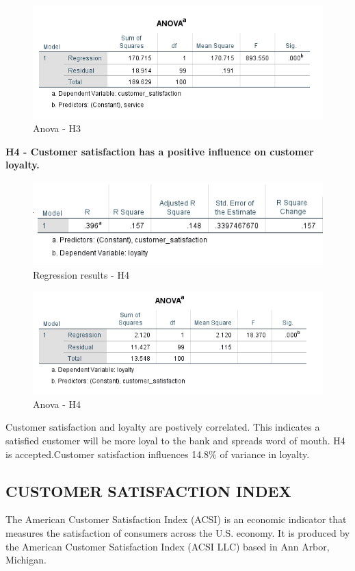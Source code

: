 \documentclass[a4paper, 12pt]{extarticle}
\begin{document}
{\begin{figure}[H]
\centering
\includegraphics[scale=1]{anova_css.png}
\caption{Anova - H3}
\end{figure}

\newpage
\par \textbf{H4 - Customer satisfaction has a positive influence on customer loyalty.}\\
\begin{figure}[H]
\centering
\includegraphics[scale=1]{customer_satisfaction_vs_loyalty.png}
\caption{Regression results - H4}
\end{figure}
\begin{figure}[H]
\centering
\includegraphics[scale=1]{anova_cs_lo.png}
\caption{Anova - H4}
\end{figure}

Customer satisfaction and loyalty are postively correlated. This indicates a satisfied customer will be more loyal to the bank and spreads word of mouth. H4 is accepted.Customer satisfaction influences 14.8\% of variance in loyalty.

\subsection{CUSTOMER SATISFACTION INDEX}
The American Customer Satisfaction Index (ACSI) is an economic indicator that measures the satisfaction of consumers across the U.S. economy. It is produced by the American Customer Satisfaction Index (ACSI LLC) based in Ann Arbor, Michigan.

}
\end{document}
